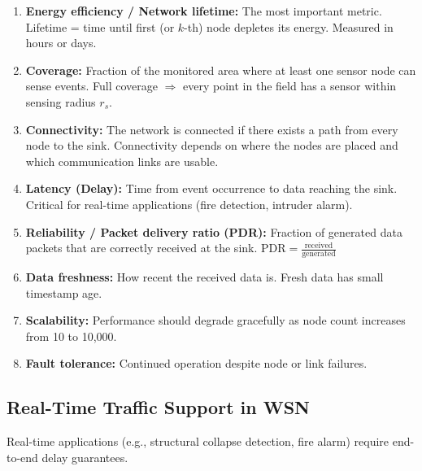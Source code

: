 \documentclass[12pt,a4paper]{article}
\begin{document}
\begin{tcolorbox}[formulabox, title={\textbf{QoS Metrics for WSN}}]
\begin{enumerate}[leftmargin=*, itemsep=5pt]
  \item \textbf{Energy efficiency / Network lifetime:} The most important metric. Lifetime = time until first (or $k$-th) node depletes its energy. Measured in hours or days.

  \item \textbf{Coverage:} Fraction of the monitored area where at least one sensor node can sense events. Full coverage $\Rightarrow$ every point in the field has a sensor within sensing radius $r_s$.

  \item \textbf{Connectivity:} The network is connected if there exists a path from every node to the sink. Connectivity depends on where the nodes are placed and which communication links are usable.

  \item \textbf{Latency (Delay):} Time from event occurrence to data reaching the sink. Critical for real-time applications (fire detection, intruder alarm).

  \item \textbf{Reliability / Packet delivery ratio (PDR):} Fraction of generated data packets that are correctly received at the sink. $\text{PDR} = \frac{\text{received}}{\text{generated}}$

  \item \textbf{Data freshness:} How recent the received data is. Fresh data has small timestamp age.

  \item \textbf{Scalability:} Performance should degrade gracefully as node count increases from 10 to 10,000.

  \item \textbf{Fault tolerance:} Continued operation despite node or link failures.
\end{enumerate}
\end{tcolorbox}

\subsection{Real-Time Traffic Support in WSN}

Real-time applications (e.g., structural collapse detection, fire alarm) require end-to-end delay guarantees.
\end{document}

